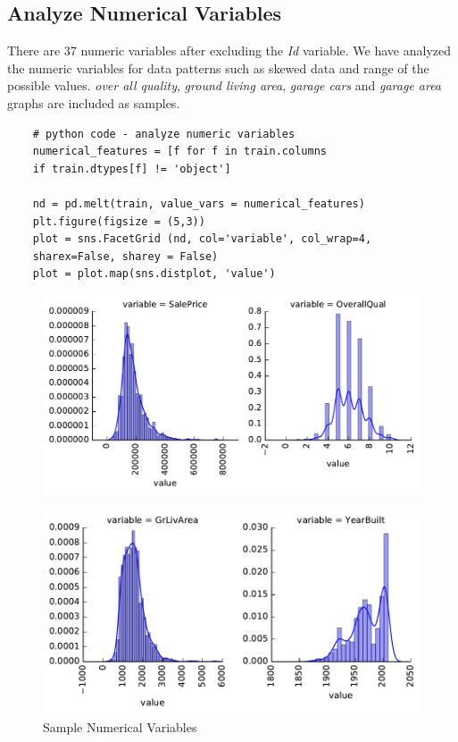 \documentclass[sigconf]{acmart}
\begin{document}
	\subsection{Analyze Numerical Variables}
	There are 37 numeric variables after excluding the {\em Id} variable. We have analyzed the numeric variables for data patterns such as skewed data and range of the possible values. {\em  over all quality}, {\em ground living area}, {\em garage cars} and {\em garage area} graphs are included as samples.
	\begin{verbatim}
	# python code - analyze numeric variables
	numerical_features = [f for f in train.columns 
	if train.dtypes[f] != 'object']
	
	nd = pd.melt(train, value_vars = numerical_features)	
	plt.figure(figsize = (5,3))
	plot = sns.FacetGrid (nd, col='variable', col_wrap=4,
	sharex=False, sharey = False)
	plot = plot.map(sns.distplot, 'value')				
	\end{verbatim}
	
	\begin{figure}[H]
		\centering
		\includegraphics[width=0.75\columnwidth]{images/num_features_1}			
	\end{figure}
	
	\begin{figure}[H]
		\centering
		\includegraphics[width=0.75\columnwidth]{images/num_features_2}	
		\caption{Sample Numerical Variables} \label{fig:num_features_2} 
	\end{figure}
	
\end{document}
